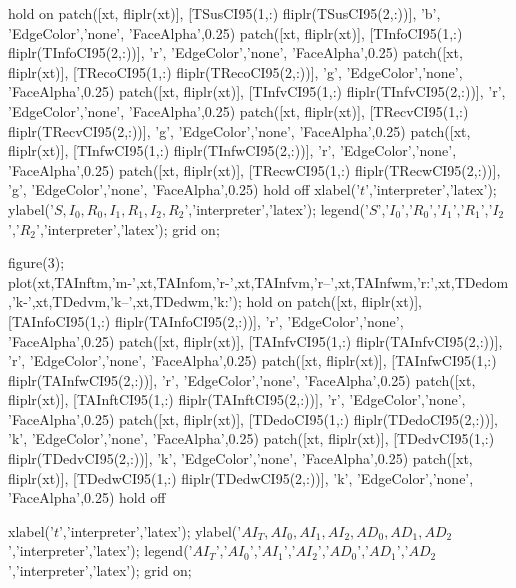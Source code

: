         hold on
        patch([xt, fliplr(xt)], [TSusCI95(1,:) fliplr(TSusCI95(2,:))], 'b', 'EdgeColor','none', 'FaceAlpha',0.25)
        patch([xt, fliplr(xt)], [TInfoCI95(1,:) fliplr(TInfoCI95(2,:))], 'r', 'EdgeColor','none', 'FaceAlpha',0.25)
        patch([xt, fliplr(xt)], [TRecoCI95(1,:) fliplr(TRecoCI95(2,:))], 'g', 'EdgeColor','none', 'FaceAlpha',0.25)
        patch([xt, fliplr(xt)], [TInfvCI95(1,:) fliplr(TInfvCI95(2,:))], 'r', 'EdgeColor','none', 'FaceAlpha',0.25)
        patch([xt, fliplr(xt)], [TRecvCI95(1,:) fliplr(TRecvCI95(2,:))], 'g', 'EdgeColor','none', 'FaceAlpha',0.25)
        patch([xt, fliplr(xt)], [TInfwCI95(1,:) fliplr(TInfwCI95(2,:))], 'r', 'EdgeColor','none', 'FaceAlpha',0.25)
        patch([xt, fliplr(xt)], [TRecwCI95(1,:) fliplr(TRecwCI95(2,:))], 'g', 'EdgeColor','none', 'FaceAlpha',0.25)
        hold off
        xlabel('$t$','interpreter','latex');        
        ylabel('$S,I_{0}, R_{0}, I_{1}, R_{1},I_{2}, R_{2}$','interpreter','latex');
        legend('$S$','$I_{0}$','$R_{0}$','$I_{1}$','$R_{1}$','$I_{2}$','$R_{2}$','interpreter','latex');
        grid on;
       
        
        figure(3);
        plot(xt,TAInftm,'m-',xt,TAInfom,'r-',xt,TAInfvm,'r--',xt,TAInfwm,'r:',xt,TDedom,'k-',xt,TDedvm,'k--',xt,TDedwm,'k:');    
        hold on
        patch([xt, fliplr(xt)], [TAInfoCI95(1,:) fliplr(TAInfoCI95(2,:))], 'r', 'EdgeColor','none', 'FaceAlpha',0.25)
        patch([xt, fliplr(xt)], [TAInfvCI95(1,:) fliplr(TAInfvCI95(2,:))], 'r', 'EdgeColor','none', 'FaceAlpha',0.25)
        patch([xt, fliplr(xt)], [TAInfwCI95(1,:) fliplr(TAInfwCI95(2,:))], 'r', 'EdgeColor','none', 'FaceAlpha',0.25)
        patch([xt, fliplr(xt)], [TAInftCI95(1,:) fliplr(TAInftCI95(2,:))], 'r', 'EdgeColor','none', 'FaceAlpha',0.25)
        patch([xt, fliplr(xt)], [TDedoCI95(1,:) fliplr(TDedoCI95(2,:))], 'k', 'EdgeColor','none', 'FaceAlpha',0.25)
        patch([xt, fliplr(xt)], [TDedvCI95(1,:) fliplr(TDedvCI95(2,:))], 'k', 'EdgeColor','none', 'FaceAlpha',0.25)
        patch([xt, fliplr(xt)], [TDedwCI95(1,:) fliplr(TDedwCI95(2,:))], 'k', 'EdgeColor','none', 'FaceAlpha',0.25)
        hold off
        
        xlabel('$t$','interpreter','latex');
        ylabel('$AI_{T}, AI_{0}, AI_{1}, AI_{2}, AD_{0},AD_{1}, AD_{2}$','interpreter','latex');
        legend('$AI_{T}$','$AI_{0}$','$AI_{1}$','$AI_{2}$','$AD_{0}$','$AD_{1}$','$AD_{2}$','interpreter','latex');
        grid on;        
